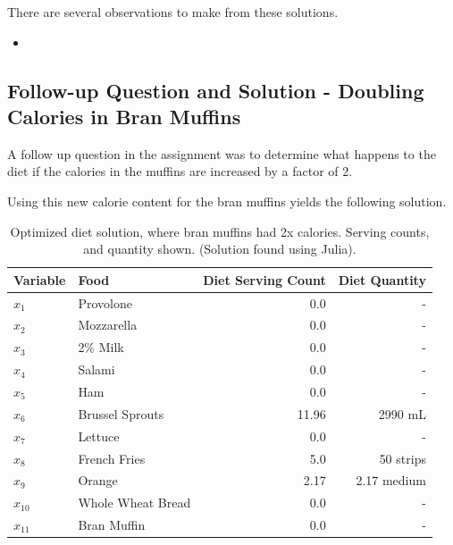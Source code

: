 \documentclass{article}
\begin{document}
    There are several observations to make from these solutions.

    \begin{itemize}
        \item 
    \end{itemize}

    \subsection{Follow-up Question and Solution - Doubling Calories in Bran Muffins}

    A follow up question in the assignment was to determine what happens to the diet if the calories in the muffins are increased by a factor of 2.

    Using this new calorie content for the bran muffins yields the following solution.


    \begin{table}[H]
        \centering
        \begin{tabular}{@{}llrr@{}}
        \toprule
        Variable & Food & Diet Serving Count & Diet Quantity \\ \midrule
        $x_1$    & Provolone         & 0.0  & - \\
        $x_2$    & Mozzarella        & 0.0  & - \\
        $x_3$    & 2\% Milk          & 0.0  & - \\
        $x_4$    & Salami            & 0.0  & - \\
        $x_5$    & Ham               & 0.0  & - \\
        $x_6$    & Brussel Sprouts   & 11.96 & 2990 mL \\
        $x_7$    & Lettuce           & 0.0  & - \\
        $x_8$    & French Fries      & 5.0  & 50 strips \\
        $x_9$    & Orange            & 2.17 & 2.17 medium \\
        $x_{10}$ & Whole Wheat Bread & 0.0  & - \\
        $x_{11}$ & Bran Muffin       & 0.0 & - \\ \bottomrule
        \end{tabular}
        \caption{Optimized diet solution, where bran muffins had 2x calories. Serving counts, and quantity shown. (Solution found using Julia). }
        \label{tab:Q1_doublecalmuffins_solution}
    \end{table}
\end{document}
